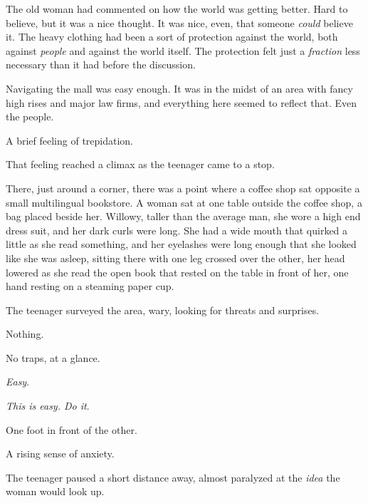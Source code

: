 The old woman had commented on how the world was getting better.  Hard to believe, but it was a nice thought.  It was nice, even, that someone \emph{could} believe it.  The heavy clothing had been a sort of protection against the world, both against \emph{people }and against the world itself.  The protection felt just a \emph{fraction} less necessary than it had before the discussion.



Navigating the mall was easy enough.  It was in the midst of an area with fancy high rises and major law firms, and everything here seemed to reflect that.  Even the people.



A brief feeling of trepidation.



That feeling reached a climax as the teenager came to a stop.



There, just around a corner, there was a point where a coffee shop sat opposite a small multilingual bookstore.  A woman sat at one table outside the coffee shop, a bag placed beside her.  Willowy, taller than the average man, she wore a high end dress suit, and her dark curls were long.  She had a wide mouth that quirked a little as she read something, and her eyelashes were long enough that she looked like she was asleep, sitting there with one leg crossed over the other, her head lowered as she read the open book that rested on the table in front of her, one hand resting on a steaming paper cup.



The teenager surveyed the area, wary, looking for threats and surprises.



Nothing.



No traps, at a glance.



\emph{Easy}.



\emph{This is easy.  Do it}.



One foot in front of the other.



A rising sense of anxiety.



The teenager paused a short distance away, almost paralyzed at the \emph{idea} the woman would look up.




